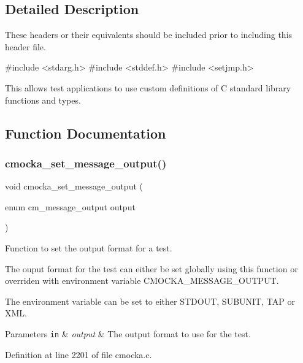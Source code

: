 \subsection{Detailed Description}
These headers or their equivalents should be included prior to including this header file. 
\begin{DoxyCode}
\textcolor{preprocessor}{#include <stdarg.h>}
\textcolor{preprocessor}{#include <stddef.h>}
\textcolor{preprocessor}{#include <setjmp.h>}
\end{DoxyCode}


This allows test applications to use custom definitions of C standard library functions and types. 

\subsection{Function Documentation}
\mbox{\label{group__cmocka_gae3764f4f38d067fe9c5faf034c07debd}} 
\subsubsection{\texorpdfstring{cmocka\+\_\+set\+\_\+message\+\_\+output()}{cmocka\_set\_message\_output()}}
{\footnotesize\ttfamily void cmocka\+\_\+set\+\_\+message\+\_\+output (\begin{DoxyParamCaption}\item[{enum cm\+\_\+message\+\_\+output}]{output }\end{DoxyParamCaption})}



Function to set the output format for a test. 

The ouput format for the test can either be set globally using this function or overriden with environment variable C\+M\+O\+C\+K\+A\+\_\+\+M\+E\+S\+S\+A\+G\+E\+\_\+\+O\+U\+T\+P\+UT.

The environment variable can be set to either S\+T\+D\+O\+UT, S\+U\+B\+U\+N\+IT, T\+AP or X\+ML.


\begin{DoxyParams}[1]{Parameters}
\mbox{\tt in}  & {\em output} & The output format to use for the test. \\
\hline
\end{DoxyParams}


Definition at line 2201 of file cmocka.\+c.

